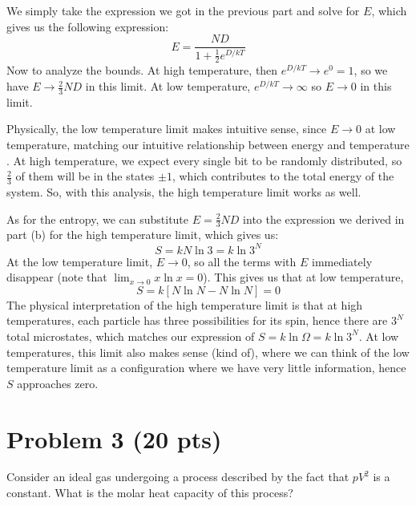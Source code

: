 \documentclass[10pt]{article}
\begin{document}
\begin{enumerate}[label=\alph*)]
			\begin{solution}
				We simply take the expression we got in the previous part and solve for $E$, which gives 
				us the following expression:
				\[
					E = \frac{ND}{1 + \frac{1}{2}e^{D / kT}}
				\] 
				Now to analyze the bounds. At high temperature, then $e^{D / kT} \to e^0 = 1$, so we have 
				$E \to \frac{2}{3}ND$ in this limit. At low temperature, $e^{D / kT} \to \infty$ so $E \to 0$
				in this limit. 

				Physically, the low temperature limit makes intuitive sense, since $E \to 0$
				at low temperature, matching our intuitive relationship between energy and temperature .
				At high temperature, we expect every single bit to be randomly 
				distributed, so $\frac{2}{3}$ of them will be in the states $\pm 1$, which contributes 
				to the total energy of the system. So, with this analysis, the high temperature limit 
				works as well.
				
				As for the entropy, we can substitute $E = \frac{2}{3}ND$ into the expression we 
				derived in part (b) for the high temperature limit, which gives us:
				\[
				S = kN \ln 3 = k \ln 3^N
				\] 
				At the low temperature limit, $E \to 0$, so all the terms with $E$ immediately disappear (note
				that $\lim_{x \to 0} x \ln x = 0$). This
				gives us that at low temperature, 
				\[
					S = k\left[N \ln N - N \ln N\right] = 0
				\] 
				The physical interpretation of the high temperature limit is that at high temperatures, each 
				particle has three possibilities for its spin, hence there are $3^N$ total microstates, which 
				matches our expression of $S = k \ln \Omega = k \ln 3^N$. At low temperatures, this limit also 
				makes sense (kind of), where we can think of the low temperature limit as a configuration where 
				we have very little information, hence $S$ approaches zero. 
			\end{solution}
	\end{enumerate}
	\pagebreak
	\section*{Problem 3 (20 pts)}
	Consider an ideal gas undergoing a process described by the fact that $pV^2$ is a constant. 
	What is the molar heat capacity of this process?
\end{document}
